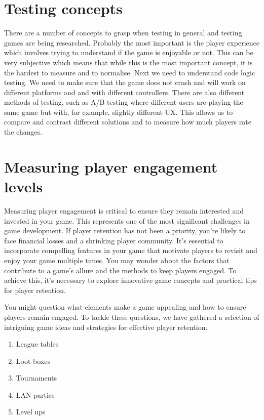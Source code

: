 \documentclass{article}
\begin{document}
\section{Testing concepts}
There are a number of concepts to grasp when testing in general and testing games are being researched. Probably the most important is the player experience which involves trying to understand if the game is enjoyable or not. This can be very subjective which means that while this is the most important concept, it is the hardest to measure and to normalise.
Next we need to understand code logic testing. We need to make sure that the game does not crash and will work on different platforms and and with different controllers.
There are also different methods of testing, such as A/B testing where different users are playing the same game but with, for example, slightly different UX. This allows us to compare and contrast different solutions and to measure how much players rate the changes.


\section{Measuring player engagement levels}
Measuring player engagement is critical to ensure they remain interested and invested in your game. This represents one of the most significant challenges in game development. If player retention has not been a priority, you're likely to face financial losses and a shrinking player community. It's essential to incorporate compelling features in your game that motivate players to revisit and enjoy your game multiple times. You may wonder about the factors that contribute to a game's allure and the methods to keep players engaged. To achieve this, it's necessary to explore innovative game concepts and practical tips for player retention.



You might question what elements make a game appealing and how to ensure players remain engaged. To tackle these questions, we have gathered a selection of intriguing game ideas and strategies for effective player retention.

\begin{enumerate}
    \item League tables
    \item Loot boxes
    \item Tournaments
    \item LAN parties
    \item Level ups
\end{enumerate}
\end{document}
